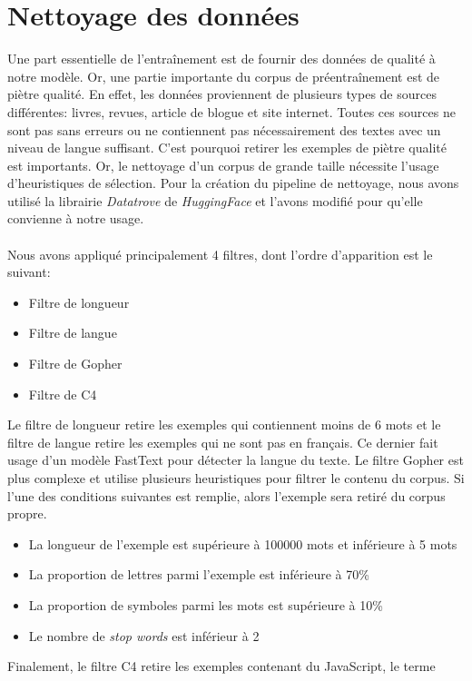 \documentclass[12pt,twoside,rapport]{dms}
\theoremstyle{definition}
\numberwithin{equation}{section}
\numberwithin{table}{chapter}
\numberwithin{figure}{chapter}
\begin{document}
\section{Nettoyage des données}
Une part essentielle de l'entraînement est de fournir des données de qualité
à notre modèle. Or, une partie importante du corpus de préentraînement est
de piètre qualité. En effet, les données proviennent de plusieurs types de
sources différentes: livres, revues, article de blogue et site internet. Toutes
ces sources ne sont pas sans erreurs ou ne contiennent pas nécessairement des
textes avec un niveau de langue suffisant. C'est pourquoi retirer les exemples
de piètre qualité est importants. Or, le nettoyage d'un corpus de grande
taille nécessite l'usage d'heuristiques de sélection. Pour la création du
pipeline de nettoyage, nous avons utilisé la librairie \textit{Datatrove} de
\textit{HuggingFace} \cite{penedo2024datatrove} et l'avons modifié pour qu'elle
convienne à notre usage.
\\
\\
Nous avons appliqué principalement 4 filtres, dont l'ordre d'apparition est le
suivant:
\begin{itemize}
	\item Filtre de longueur
	\item Filtre de langue
	\item Filtre de Gopher
	\item Filtre de C4
\end{itemize}
Le filtre de longueur retire les exemples qui contiennent moins de 6 mots et le
filtre de langue retire les exemples qui ne sont pas en français. Ce dernier
fait usage d'un modèle FastText \cite{joulin2016fasttext} pour détecter la
langue du texte. Le filtre Gopher est plus complexe et utilise plusieurs
heuristiques pour filtrer le contenu du corpus. Si l'une des conditions
suivantes est remplie, alors l'exemple sera retiré du corpus propre.
\begin{itemize}
	\item La longueur de l'exemple est supérieure à 100000 mots et inférieure à 5 mots
	\item La proportion de lettres parmi l'exemple est inférieure à 70\%
	\item La proportion de symboles parmi les mots est supérieure à 10\%
	\item Le nombre de \textit{stop words} est inférieur à 2
\end{itemize}
Finalement, le filtre C4 retire les exemples contenant du JavaScript, le terme
\end{document}
